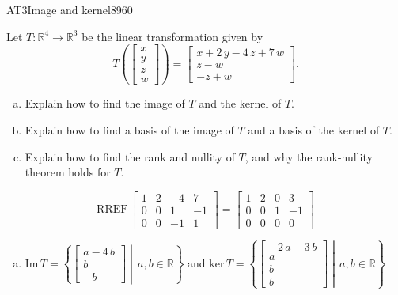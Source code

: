 \begin{exercise}{AT3}{Image and kernel}{8960} 
\begin{exerciseStatement} 

 Let \(T:\mathbb{R}^4 \to \mathbb{R}^3\) be the linear transformation given by \[T\left( \left[\begin{array}{c}
x \\
y \\
z \\
{w}
\end{array}\right] \right) = \left[\begin{array}{c}
x + 2 \, y - 4 \, z + 7 \, {w} \\
z - {w} \\
-z + {w}
\end{array}\right].\] 

 

\begin{enumerate}[(a)]
\item Explain how to find the image of \(T\) and the kernel of \(T\).
\item Explain how to find a basis of the image of \(T\) and a basis of the kernel of \(T\).
\item Explain how to find the rank and nullity of \(T\), and why the rank-nullity theorem holds for \(T\).
\end{enumerate}

     \end{exerciseStatement}
 \begin{exerciseAnswer} 

\[\mathrm{RREF}\,\left[\begin{array}{cccc}
1 & 2 & -4 & 7 \\
0 & 0 & 1 & -1 \\
0 & 0 & -1 & 1
\end{array}\right]=\left[\begin{array}{cccc}
1 & 2 & 0 & 3 \\
0 & 0 & 1 & -1 \\
0 & 0 & 0 & 0
\end{array}\right]\]

 

\begin{enumerate}[(a)]
\item  

 \(\mathrm{Im}\,T =  \left\{ \left[\begin{array}{c}
a - 4 \, b \\
b \\
-b
\end{array}\right] \middle|\,a,b\in\mathbb{R}\right\}\) and \(\mathrm{ker}\,T = \left\{ \left[\begin{array}{c}
-2 \, a - 3 \, b \\
a \\
b \\
b
\end{array}\right] \middle|\,a,b\in\mathbb{R}\right\}\) 


\end{enumerate}
\end{exerciseAnswer}
\end{exercise}
